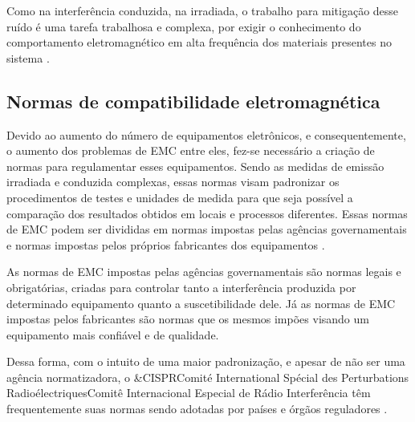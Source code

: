         Como na interferência conduzida, na irradiada, o trabalho para mitigação desse ruído é uma tarefa trabalhosa e complexa, por exigir o conhecimento do comportamento eletromagnético em alta frequência dos materiais presentes no sistema \cite{ref:EMC_phd_schlichting}.
        
        
        
        \subsection{Normas de compatibilidade eletromagnética} \label{cap:fund_emc_norma}
        
        Devido ao aumento do número de equipamentos eletrônicos, e consequentemente, o aumento dos problemas de EMC entre eles, fez-se necessário a criação de normas para regulamentar esses equipamentos. Sendo as medidas de emissão irradiada e conduzida complexas, essas normas visam padronizar os procedimentos de testes e unidades de medida para que seja possível a comparação dos resultados obtidos em locais e processos diferentes. Essas normas de EMC podem ser divididas em normas impostas pelas agências governamentais e normas impostas pelos próprios fabricantes dos equipamentos \cite{ref:EMC_phd_schlichting}. 
        
        As normas de EMC impostas pelas agências governamentais são normas legais e obrigatórias, criadas para controlar tanto a interferência produzida por determinado equipamento quanto a suscetibilidade dele. Já as normas de EMC impostas pelos fabricantes são normas que os mesmos impões visando um equipamento mais confiável e de qualidade.
        
        Dessa forma, com o intuito de uma maior padronização, e apesar de não ser uma agência normatizadora, o \abreviatura&{CISPR}{Comité International Spécial des Perturbations Radioélectriques}{Comitê Internacional Especial de Rádio Interferência} têm frequentemente suas normas sendo adotadas por países e órgãos reguladores \cite{ref:EMC_iec_about, ref:EMC_phd_schlichting}.
        
